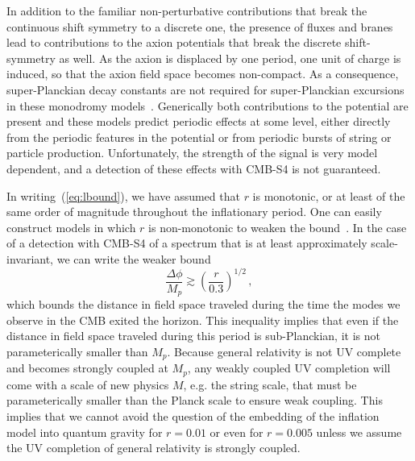 In addition to the familiar non-perturbative contributions that break the continuous shift symmetry to a discrete one, the presence of fluxes and branes lead to contributions to the axion potentials that break the discrete shift-symmetry as well. As the axion is displaced by one period, one unit of charge is induced, so that the axion field space becomes non-compact. As a consequence, super-Planckian decay constants are not required for super-Planckian excursions in these monodromy models~\cite{Silverstein:2008sg, McAllister:2008hb, Kaloper:2008fb, Berg:2009tg, Palti:2014kza,McAllister:2014mpa, Marchesano:2014mla, Blumenhagen:2015xpa,Hebecker:2015tzo}. Generically both contributions to the potential are present and these models predict periodic effects at some level, either directly from the periodic features in the potential or from periodic bursts of string or particle production. Unfortunately, the strength of the signal is very model dependent, and a detection of these effects with CMB-S4 is not guaranteed.

In writing~(\ref{eq:lbound}), we have assumed that $r$ is monotonic, or at least of the same order of magnitude throughout the inflationary period. One can easily construct models in which $r$ is non-monotonic to weaken the bound~\cite{BenDayan:2009kv,Hotchkiss:2011gz, Chatterjee:2014hna}. In the case of a detection with CMB-S4 of a spectrum that is at least approximately scale-invariant, we can write the weaker bound
\begin{equation}
\frac{\Delta\phi}{M_p}\gtrsim\left(\frac{r}{0.3}\right)^{1/2}\,,
\end{equation}
which bounds the distance in field space traveled during the time the modes we observe in the CMB exited the horizon. This inequality implies that even if the distance in field space traveled during this period is sub-Planckian, it is not parameterically smaller than $M_p$. Because general relativity is not UV complete and becomes strongly coupled at $M_p$, any weakly coupled UV completion will come with a scale of new physics $M$, e.g. the string scale, that must be parameterically smaller than the Planck scale to ensure weak coupling. This implies that we cannot avoid the question of the embedding of the inflation model into quantum gravity for $r=0.01$ or even for $r=0.005$ unless we assume the UV completion of general relativity is strongly coupled. 

